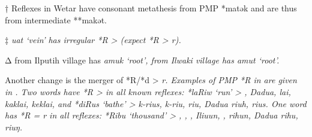 \begin{table}
\begin{threeparttable}
		\begin{tablenotes}\tnsize
			\item[†]	{Reflexes in Wetar have consonant metathesis from PMP *matək
								and are thus from intermediate **makət.}
			\item[‡]	{ \it{uat} ‘vein’ has irregular *R > {\0} (expect *R > \it{r}).}
			\item[Δ]	{ from Ilputih village has \it{amuk} ‘root’,
								 from Ilwaki village has \it{amut} ‘root’.}
		\end{tablenotes}
	\end{threeparttable}
\end{table}

Another  change is the merger of *R/*d > \it{r}.
Examples of PMP *R in  are given in .
Two words have *R > {\0} in all known  reflexes:
*laRiw ‘run’ > ,
Dadu{\Q}a,  \it{lai},  \it{kaklai},
 \it{keklai}, and *diRus ‘bathe’ >  \it{k-rius,}
 \it{k-riu},  \it{riu}, Dadu{\Q}a \it{riuh},  \it{rius}.
One word has *R = \it{r} in all reflexes: *Ribu ‘thousand’ >
, , , Ili{\Q}uun, ,
 \it{rihun}, Dadu{\Q}a \it{rihu},
 \it{riuŋ}.

